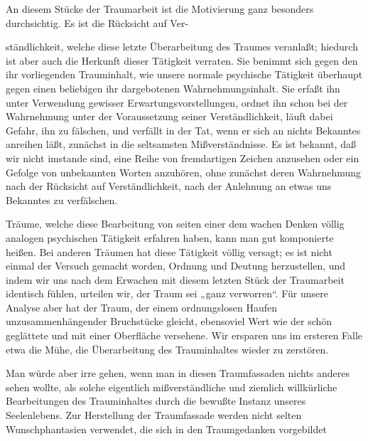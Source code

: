 \documentclass[twoside=true,titlepage=false,open=any, parskip=never, fontsize=10pt, headings=small, chapterprefix=false, appendixprefix=false]{scrbook}
\begin{document}
            
        \pstart
        An diesem Stücke der Traumarbeit ist die Motivierung ganz besonders
               durchsichtig. Es ist die Rücksicht auf Ver-
        \pend
    
         
            
            
            
        \pstart
        ständlichkeit, welche diese letzte
               Überarbeitung des Traumes veranlaßt; hiedurch ist aber auch die Herkunft dieser
               Tätigkeit verraten. Sie benimmt sich gegen den ihr vorliegenden Trauminhalt, wie unsere normale psychische Tätigkeit überhaupt gegen
               einen beliebigen ihr dargebotenen Wahrnehmungsinhalt. Sie erfaßt ihn unter
               Verwendung gewisser Erwartungsvorstellungen, ordnet ihn schon bei der
               Wahrnehmung unter der Voraussetzung seiner Verständlichkeit, läuft dabei Gefahr,
               ihn zu fälschen, und verfällt in der Tat, wenn er sich an nichts Bekanntes
               anreihen läßt, zunächst in die seltsamsten Mißverständnisse. Es ist
               bekannt, daß wir nicht imstande sind, eine Reihe von fremdartigen Zeichen
               anzusehen oder ein Gefolge von unbekannten Worten anzuhören, ohne zunächst deren
               Wahrnehmung nach der Rücksicht auf Verständlichkeit,
               nach der Anlehnung an etwas uns Bekanntes zu verfälschen.
        \pend
    
            
        \pstart
        Träume, welche diese Bearbeitung von seiten einer dem wachen Denken völlig
               analogen psychischen Tätigkeit erfahren haben, kann man gut komponierte heißen. Bei anderen Träumen hat
               diese Tätigkeit völlig versagt; es ist nicht einmal der Versuch gemacht worden,
               Ordnung und Deutung herzustellen, und indem wir uns nach dem Erwachen mit diesem
               letzten Stück der Traumarbeit identisch fühlen, urteilen wir, der
               Traum sei „ganz verworren“. Für unsere Analyse aber hat der Traum,
               der einem ordnungslosen Haufen unzusammenhängender Bruchstücke gleicht,
               ebensoviel Wert wie der schön geglättete und mit einer Oberfläche
               versehene. Wir ersparen uns im ersteren Falle etwa die Mühe, die Überarbeitung
               des Trauminhaltes wieder zu zerstören.
        \pend
    
            
        \pstart
        Man würde aber irre gehen, wenn man in diesen Traumfassaden nichts
               anderes sehen wollte, als solche eigentlich mißverständliche und
               ziemlich willkürliche Bearbeitungen des Trauminhaltes durch die
               bewußte Instanz unseres Seelenlebens. Zur Herstellung der Traumfassade werden
               nicht selten Wunschphantasien verwendet, die sich in den
               Traumgedanken vorgebildet
        \pend
    
\end{document}
